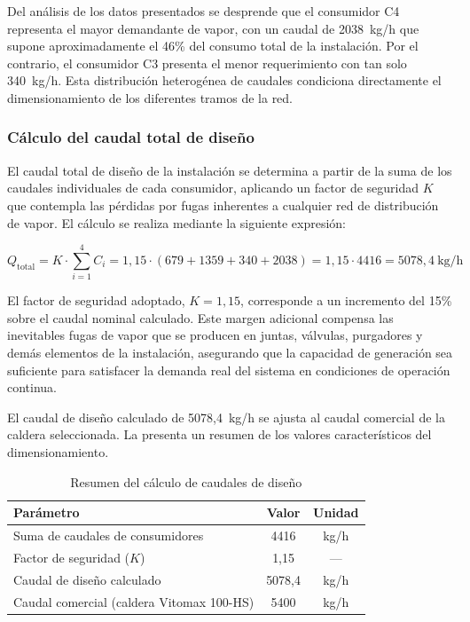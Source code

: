 Del análisis de los datos presentados se desprende que el consumidor C4 representa el mayor demandante de vapor, con un caudal de 2038~kg/h que supone aproximadamente el 46\% del consumo total de la instalación. Por el contrario, el consumidor C3 presenta el menor requerimiento con tan solo 340~kg/h. Esta distribución heterogénea de caudales condiciona directamente el dimensionamiento de los diferentes tramos de la red.

\subsubsection{Cálculo del caudal total de diseño}

El caudal total de diseño de la instalación se determina a partir de la suma de los caudales individuales de cada consumidor, aplicando un factor de seguridad $K$ que contempla las pérdidas por fugas inherentes a cualquier red de distribución de vapor. El cálculo se realiza mediante la siguiente expresión:

\begin{equation}
	Q_{\text{total}} = K \cdot \sum_{i=1}^{4} C_i = 1{,}15 \cdot (679 + 1359 + 340 + 2038) = 1{,}15 \cdot 4416 = 5078{,}4 \ \text{kg/h}
	\label{eq:caudal-total-diseno}
\end{equation}

El factor de seguridad adoptado, $K = 1{,}15$, corresponde a un incremento del 15\% sobre el caudal nominal calculado. Este margen adicional compensa las inevitables fugas de vapor que se producen en juntas, válvulas, purgadores y demás elementos de la instalación, asegurando que la capacidad de generación sea suficiente para satisfacer la demanda real del sistema en condiciones de operación continua.

El caudal de diseño calculado de 5078,4~kg/h se ajusta al caudal comercial de la caldera seleccionada. La  presenta un resumen de los valores característicos del dimensionamiento.

\begin{table}[H]
	\centering
	\caption{Resumen del cálculo de caudales de diseño}
	\label{tab:resumen-caudales}
	\begin{tabular}{lcc}
		\toprule
		\textbf{Parámetro}                        & \textbf{Valor} & \textbf{Unidad} \\
		\midrule
		Suma de caudales de consumidores          & 4416           & kg/h            \\
		Factor de seguridad ($K$)                 & 1,15           & ---             \\
		Caudal de diseño calculado                & 5078,4         & kg/h            \\
		Caudal comercial (caldera Vitomax 100-HS) & 5400           & kg/h            \\
		\bottomrule
	\end{tabular}
\end{table}

